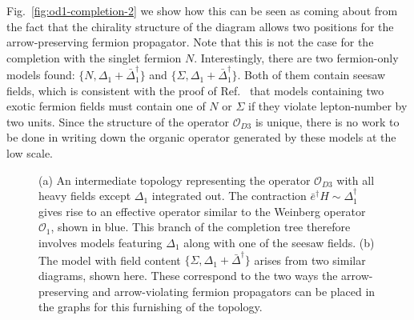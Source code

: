 Fig.~\ref{fig:od1-completion-2} we show how this can be seen as coming about
from the fact that the chirality structure of the diagram allows two positions
for the arrow-preserving fermion propagator. Note that this is not the case for
the completion with the singlet fermion $N$. Interestingly, there are two
fermion-only models found: $\{N, \Delta_{1} + \bar{\Delta}^{\dagger}_{1}\}$ and
$\{\Sigma, \Delta_{1} + \bar{\Delta}^{\dagger}_{1}\}$. Both of them contain
seesaw fields, which is consistent with the proof of Ref.~\cite{Klein:2019iws}
that models containing two exotic fermion fields must contain one of $N$ or
$\Sigma$ if they violate lepton-number by two units. Since the structure of the
operator $\mathcal{O}_{D3}$ is unique, there is no work to be done in writing
down the organic operator generated by these models at the low scale.

\begin{figure}[t]
  \centering
  \caption[(a) An intermediate topology representing the operator
  $\mathcal{O}_{D3}$ with all heavy fields except $\Delta_{1}$ integrated out.
  (b) The model with field content
  $\{\Sigma, \Delta_{1} + \bar{\Delta}^{\dagger}\}$ arises from two similar
  diagrams, shown here.]{(a) An intermediate topology representing the operator
    $\mathcal{O}_{D3}$ with all heavy fields except $\Delta_{1}$ integrated out.
    The contraction $\bar{e}^{\dagger} H \sim \Delta^{\dagger}_{1}$ gives rise
    to an effective operator similar to the Weinberg operator $\mathcal{O}_{1}$,
    shown in blue. This branch of the completion tree therefore involves models
    featuring $\Delta_{1}$ along with one of the seesaw fields. (b) The model
    with field content $\{\Sigma, \Delta_{1} + \bar{\Delta}^{\dagger}\}$ arises
    from two similar diagrams, shown here. These correspond to the two ways the
    arrow-preserving and arrow-violating fermion propagators can be placed in
    the graphs for this furnishing of the topology.}
  \label{fig:od1-completion}
\end{figure}

